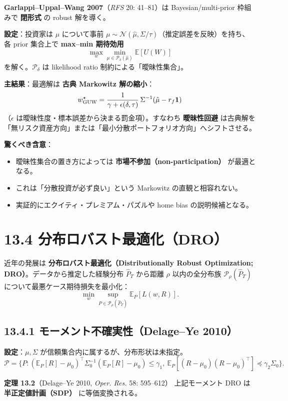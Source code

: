 \documentclass[11pt,a4paper]{report}
\begin{document}
\textbf{Garlappi–Uppal–Wang 2007}（\emph{RFS} 20: 41–81）は Bayesian/multi-prior 枠組みで \textbf{閉形式} の robust 解を導く。

\textbf{設定}：投資家は $\mu$ について事前 $\mu \sim \mathcal{N}(\hat\mu, \Sigma/\tau)$（推定誤差を反映）を持ち、各 prior 集合上で \textbf{max–min 期待効用} \[ \max_w \min_{\mu \in \mathcal{P}_\delta(\hat\mu)} \mathbb{E}[U(W)] \] を解く。$\mathcal{P}_\delta$ は likelihood ratio 制約による「曖昧性集合」。

\textbf{主結果}：最適解は \textbf{古典 Markowitz 解の縮小}： \[ w_{\rm GUW}^\star = \frac{1}{\gamma + \epsilon(\delta, \tau)}\, \Sigma^{-1}(\hat\mu - r_f \mathbf{1}) \] （$\epsilon$ は曖昧性度・標本誤差から決まる罰金項）。すなわち \textbf{曖昧性回避} は古典解を「無リスク資産方向」または「最小分散ポートフォリオ方向」へシフトさせる。

\textbf{驚くべき含意}：
\begin{itemize}
\item 曖昧性集合の置き方によっては \textbf{市場不参加（non-participation）} が最適となる。
\item これは「分散投資が必ず良い」という Markowitz の直観と相容れない。
\item 実証的にエクイティ・プレミアム・パズルや home bias の説明候補となる。
\end{itemize}

\section{13.4 分布ロバスト最適化（DRO）}

近年の発展は \textbf{分布ロバスト最適化（Distributionally Robust Optimization; DRO）}。データから推定した経験分布 $\hat P_T$ から距離 $\rho$ 以内の全分布族 $\mathcal{P}_\rho(\hat P_T)$ について最悪ケース期待損失を最小化： \[ \min_w \sup_{P \in \mathcal{P}_\rho(\hat P_T)} \mathbb{E}_P[L(w, R)]. \]

\subsection{13.4.1 モーメント不確実性（Delage–Ye 2010）}

\textbf{設定}：$\mu, \Sigma$ が信頼集合内に属するが、分布形状は未指定。 \[ \mathcal{P} = \{ P : (\mathbb{E}_P[R] - \mu_0)^\top \Sigma_0^{-1} (\mathbb{E}_P[R] - \mu_0) \le \gamma_1,\ \mathbb{E}_P[(R - \mu_0)(R - \mu_0)^\top] \preceq \gamma_2 \Sigma_0 \}. \]

\textbf{定理 13.2}（Delage–Ye 2010, \emph{Oper. Res.} 58: 595–612） 上記モーメント DRO は \textbf{半正定値計画（SDP）} に等価変換される。
\end{document}
